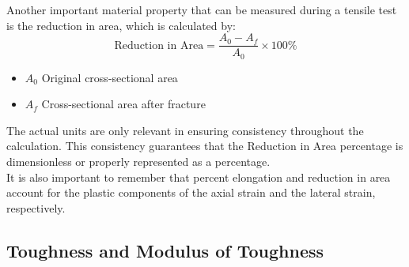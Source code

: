 \documentclass{article}
\begin{document}
Another important material property that can be measured during a tensile test is the reduction in area, which is calculated by:
\begin{equation}
    \text{Reduction in Area} = \frac{A_0 - A_f}{A_0} \times 100\%
\end{equation}
\begin{itemize}[itemsep=-1mm]
    \item $A_0$ Original cross-sectional area
    \item $A_f$ Cross-sectional area after fracture
\end{itemize}
The actual units are only relevant in ensuring consistency throughout the calculation. This consistency guarantees that the Reduction in Area percentage is dimensionless or properly represented as a percentage.\\ It is also important to remember that percent elongation and reduction in area account for the plastic components of the axial strain and the lateral strain, respectively.\\



    \newpage

\subsection{Toughness and Modulus of Toughness}
\end{document}
